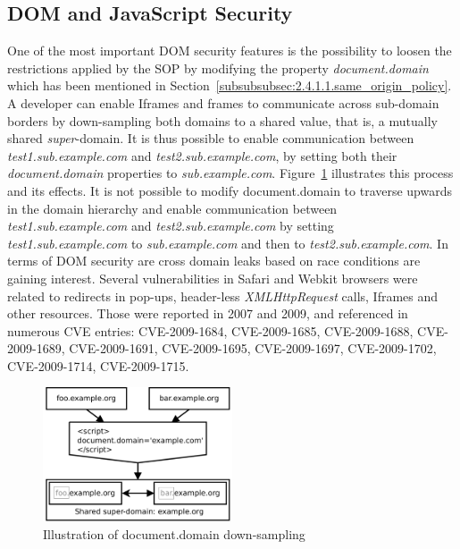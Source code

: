     \subsection{DOM and JavaScript Security}
    \label{subsubsec:2.4.2.dom_and_javascript_security}

      One of the most important DOM security features is the possibility to loosen the restrictions applied by the SOP by modifying the property \textit{document.domain} which has been mentioned in Section~\ref{subsubsubsec:2.4.1.1.same_origin_policy}. A developer can enable Iframes and frames to communicate across sub-domain borders by down-sampling both domains to a shared value, that is, a mutually shared \textit{super}-domain. It is thus possible to enable communication between \textit{test1.sub.example.com} and \textit{test2.sub.example.com}, by setting both their \textit{document.domain} properties to \textit{sub.example.com}. Figure~\ref{fig:doc-dom} illustrates this process and its effects. It is not possible to modify document.domain to traverse upwards in the domain hierarchy and enable communication between \textit{test1.sub.example.com} and \textit{test2.sub.example.com} by setting \textit{test1.sub.example.com} to \textit{sub.example.com} and then to \textit{test2.sub.example.com}. In terms of 
DOM security are cross domain leaks based on race conditions are gaining interest. Several vulnerabilities in Safari and Webkit browsers were related to redirects in pop-ups, header-less \textit{XMLHttpRequest} calls, Iframes and other resources. Those were reported in 2007 and 2009, and referenced in numerous CVE entries: CVE-2009-1684, CVE-2009-1685, CVE-2009-1688, CVE-2009-1689, CVE-2009-1691, CVE-2009-1695, CVE-2009-1697, CVE-2009-1702, CVE-2009-1714, CVE-2009-1715. \\

\begin{figure}[htb]
\centering
\includegraphics[width=0.5\textwidth]{./img/doc-dom.pdf}
\caption{Illustration of document.domain down-sampling}
\label{fig:doc-dom}
\end{figure}

